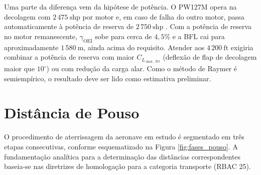 Uma parte da diferença vem da hipótese de potência. O PW127M opera na decolagem com $2\,475~\mathrm{shp}$ por motor e, em caso de falha do outro motor, passa automaticamente à potência de reserva de $2\,750~\mathrm{shp}$ \cite{atr72600}. Com a potência de reserva no motor remanescente, $\gamma_{\mathrm{OEI}}$ sobe para cerca de $4{,}5\%$ e a BFL cai para aproximadamente $1\,580~\mathrm{m}$, ainda acima do requisito. Atender aos $4\,200~\mathrm{ft}$ exigiria combinar a potência de reserva com maior $C_{L_{\max,TO}}$ (deflexão de flap de decolagem maior que $10^\circ$) ou com redução da carga alar. Como o método de Raymer é semiempírico, o resultado deve ser lido como estimativa preliminar.


\section{Distância de Pouso}

O procedimento de aterrissagem da aeronave em estudo é segmentado em três etapas consecutivas, conforme esquematizado na Figura \ref{fig:fases_pouso}. A fundamentação analítica para a determinação das distâncias correspondentes baseia-se nas diretrizes de homologação para a categoria transporte (RBAC 25). 

